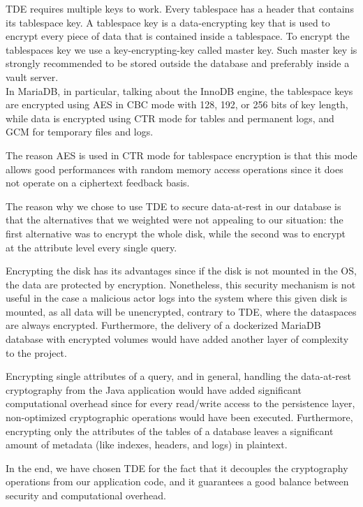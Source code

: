 TDE requires multiple keys to work. Every tablespace has a header that contains its tablespace key. A tablespace key is a data-encrypting key that is used to encrypt every piece of data that is contained inside a tablespace. To encrypt the tablespaces key we use a key-encrypting-key called master key. Such master key is strongly recommended to be stored outside the database and preferably inside a vault server.\\ In MariaDB, in particular, talking about the InnoDB engine, the tablespace keys are encrypted using AES in CBC mode with 128, 192, or 256 bits of key length, while data is encrypted using CTR mode for tables and permanent logs, and GCM for temporary files and logs.

The reason AES is used in CTR mode for tablespace encryption is that this mode allows good performances with random memory access operations since it does not operate on a ciphertext feedback basis.

The reason why we chose to use TDE to secure data-at-rest in our database is that the alternatives that we weighted were not appealing to our situation: the first alternative was to encrypt the whole disk, while the second was to encrypt at the attribute level every single query. 

Encrypting the disk has its advantages since if the disk is not mounted in the OS, the data are protected by encryption. Nonetheless, this security mechanism is not useful in the case a malicious actor logs into the system where this given disk is mounted, as all data will be unencrypted, contrary to TDE, where the dataspaces are always encrypted. Furthermore, the delivery of a dockerized MariaDB database with encrypted volumes would have added another layer of complexity to the project.

Encrypting single attributes of a query, and in general, handling the data-at-rest cryptography from the Java application would have added significant computational overhead since for every read/write access to the persistence layer, non-optimized cryptographic operations would have been executed. Furthermore, encrypting only the attributes of the tables of a database leaves a significant amount of metadata (like indexes, headers, and logs) in plaintext.

In the end, we have chosen TDE for the fact that it decouples the cryptography operations from our application code, and it guarantees a good balance between security and computational overhead.

\newpage
